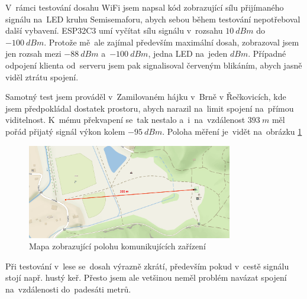 V~rámci testování dosahu WiFi jsem napsal kód zobrazující sílu přijímaného signálu na~LED kruhu Semisemaforu, abych sebou během testování nepotřeboval další vybavení.
ESP32C3 umí vyčítat sílu signálu v~rozsahu \(10~dBm\) do~\(-100~dBm\).
Protože mě~ale zajímal především maximální dosah, zobrazoval jsem jen rozsah mezi \(-88~dBm\) a~\(-100~dBm\), jedna LED na~jeden \(dBm\).
Případné odpojení klienta od~serveru jsem pak signalisoval červeným blikáním, abych jasně viděl ztrátu spojení.

Samotný test jsem prováděl v~Zamilovaném hájku v~Brně v Řečkovicích, kde jsem předpokládal dostatek prostoru, abych narazil na~limit spojení na~přímou viditelnost.
K~mému překvapení se~tak nestalo a~i~na~vzdálenost \(393~m\) měl pořád přijatý signál výkon kolem \(-95~dBm\).
Poloha měření je~vidět na~obrázku \ref{Semisemafor-dosah-zamilec}

\begin{figure}[!h]
  \centering
  \includegraphics[width=0.8\textwidth]{text/PraktickaCast/img/mapa-zamilec-semafor.png}
  \caption{Mapa zobrazující polohu komunikujících zařízení \cite{MereniDosahuSemaforu-zamilec}}
  \label{Semisemafor-dosah-zamilec}
\end{figure}

Při testování v~lese se~dosah výrazně zkrátí, především pokud v~cestě signálu stojí např. hustý keř.
Přesto jsem ale vetšinou neměl problém navázat spojení na~vzdálenosti do~padesáti metrů.
